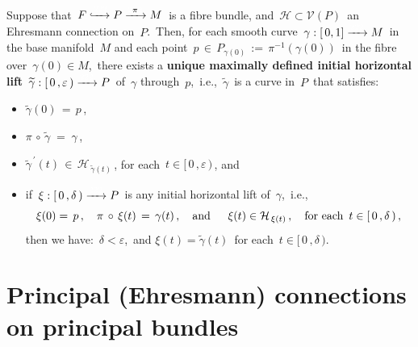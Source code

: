 \vskip 0.5cm
\begin{lemma}
\mbox{}
\vskip -0.05cm
\noindent
Suppose that
\,$F \xhookrightarrow{{\color{white}222}} P \xrightarrow{{\color{white}2}\pi{\color{white}2}} M$\,
is a fibre bundle, and \,$\mathcal{H} \subset \mathcal{V}(P)$\, an Ehresmann connection on \,$P$.\,
Then, for each smooth curve
\,$\gamma : [\,0,1] \xrightarrow{{\color{white}222}} M$\,
in the base manifold \,$M$
and each point
\,$p \,\in\, P_{\gamma(0)} \,:=\, \pi^{-1}(\gamma(0))$\,
in the fibre over
\,$\gamma(0) \in M$,\,
there exists a \textbf{\color{black}unique maximally defined initial horizontal lift}
\;\,$\widetilde{\gamma} : [\,0\,,\varepsilon\,) \xrightarrow{{\color{white}222}} P$\,
of \,$\gamma$ through \,$p$,\,
i.e., \,$\widetilde{\gamma}$\, is a curve in \,$P$\, that satisfies:
\begin{itemize}
\item
	$\widetilde{\gamma}(0) \,=\, p$\,,
\item
	$\pi \,\circ\, \widetilde{\gamma} \; = \; \gamma$\,,
\item
	$\widetilde{\gamma}^{\,\prime}(t) \,\in\, \mathcal{H}_{\,\widetilde{\gamma}(t)}$\,,\;
	for each \,$t \in [\,0\,,\varepsilon\,)$\,, and
\item
	if
	\,$\xi : [\,0\,,\delta\,) \xrightarrow{{\color{white}222}} P$\,
	is any initial horizontal lift of \,$\gamma$,\, i.e.,
	\begin{equation*}
	\xi(0) =\, p\,,
	\quad
	\pi \,\circ\, \xi(t) \,=\, \gamma(t)\,,
	\quad\textnormal{and}\quad\;\;
	\xi(t) \in \mathcal{H}_{\,\xi(t)}\,,
	\quad
	\textnormal{for each \,$t \in [\,0\,,\delta\,)$}\,,
	\end{equation*}
	then we have: \,$\delta < \varepsilon$,\, and
	\;$\xi(t) = \widetilde{\gamma}(t)$\, for each \,$t \in [\,0\,,\delta\,)$.\,
\end{itemize}
\end{lemma}


\vskip 0.5cm
\section{Principal (Ehresmann) connections on principal bundles}


